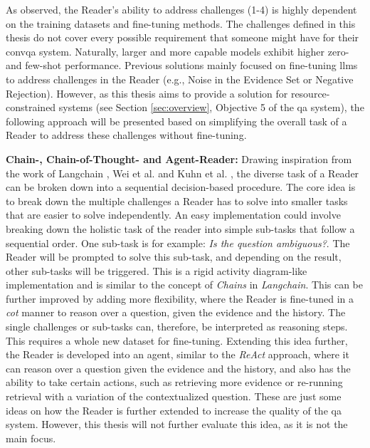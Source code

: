 As observed, the Reader's ability to address challenges (1-4) is highly dependent on the training datasets and fine-tuning methods. The challenges defined in this thesis do not cover every possible requirement that someone might have for their \gls{convqa} system. Naturally, larger and more capable models exhibit higher zero- and few-shot performance. Previous solutions mainly focused on fine-tuning \gls{llm}s to address challenges in the Reader (e.g., Noise in the Evidence Set or Negative Rejection). However, as this thesis aims to provide a solution for resource-constrained systems (see Section \ref{sec:overview}, Objective 5 of the \gls{qa} system), the following approach will be presented based on simplifying the overall task of a Reader to address these challenges without fine-tuning.

\vspace{\baselineskip}

\textbf{Chain-, Chain-of-Thought- and Agent-Reader:} Drawing inspiration from the work of Langchain \cite{noauthor_langchain-ailangchain_nodate}, Wei et al. \cite{wei_chain--thought_2023} and Kuhn et al. \cite{kuhn_clam_2023}, the diverse task of a Reader can be broken down into a sequential decision-based procedure. The core idea is to break down the multiple challenges a Reader has to solve into smaller tasks that are easier to solve independently. An easy implementation could involve breaking down the holistic task of the reader into simple sub-tasks that follow a sequential order. One sub-task is for example: \textit{Is the question ambiguous?}. The Reader will be prompted to solve this sub-task, and depending on the result, other sub-tasks will be triggered. This is a rigid activity diagram-like implementation and is similar to the concept of \textit{Chains} in \textit{Langchain}. This can be further improved by adding more flexibility, where the Reader is fine-tuned in a \textit{\gls{cot}} manner to reason over a question, given the evidence and the history. The single challenges or sub-tasks can, therefore, be interpreted as reasoning steps. This requires a whole new dataset for fine-tuning. Extending this idea further, the Reader is developed into an agent, similar to the \textit{ReAct} approach, where it can reason over a question given the evidence and the history, and also has the ability to take certain actions, such as retrieving more evidence or re-running retrieval with a variation of the contextualized question. These are just some ideas on how the Reader is further extended to increase the quality of the \gls{qa} system. However, this thesis will not further evaluate this idea, as it is not the main focus.

